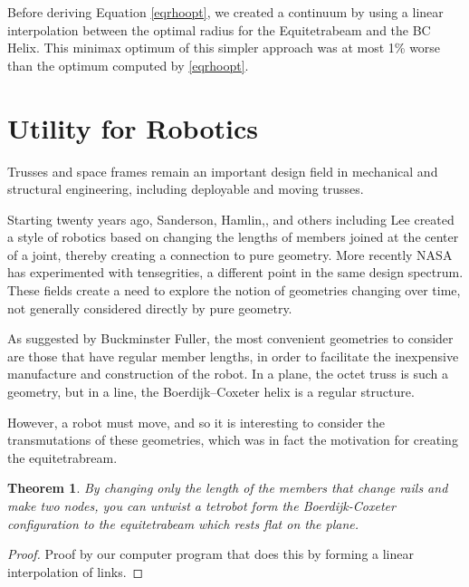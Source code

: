 \documentclass[11pt]{article}
\newtheorem{theorem}{Theorem}
\begin{document}
Before deriving Equation \eqref{eqrhoopt}, we created a continuum by
using a linear interpolation between the optimal radius for the
Equitetrabeam and the BC Helix. This minimax optimum of this simpler
approach was at most 1\% worse than the optimum computed by
\eqref{eqrhoopt}.


\section{Utility for Robotics}

Trusses and space frames remain an important design field in
mechanical and structural engineering\cite{mikulas1985sequentially},
including deployable and moving trusses\cite{claypool2012readily}.

Starting twenty years ago, Sanderson\cite{sanderson1996modular},
Hamlin,\cite{TetrobotBook}, and others including
Lee\cite{lee2002dynamic} created a style of robotics based on changing
the lengths of members joined at the center of a joint, thereby
creating a connection to pure geometry. More recently NASA has
experimented with tensegrities\cite{NTRT}, a different point in the
same design spectrum. These fields create a need to explore the notion
of geometries changing over time, not generally considered directly by
pure geometry.

As suggested by Buckminster Fuller, the most convenient geometries to
consider are those that have regular member lengths, in order to
facilitate the inexpensive manufacture and construction of the robot.
In a plane, the octet truss is such a geometry, but in a line, the
Boerdijk--Coxeter helix is a regular structure.

However, a robot must move, and so it is interesting to consider the
transmutations of these geometries, which was in fact the motivation
for creating the equitetrabream.

\begin{theorem}
  By changing only the length of the members that change rails and make two nodes, you can untwist a tetrobot
  form the Boerdijk-Coxeter configuration to the equitetrabeam which rests flat on the plane.
\end{theorem}

\begin{proof}
  Proof by our computer program that does this by forming a linear interpolation of links.
\end{proof}
\end{document}
